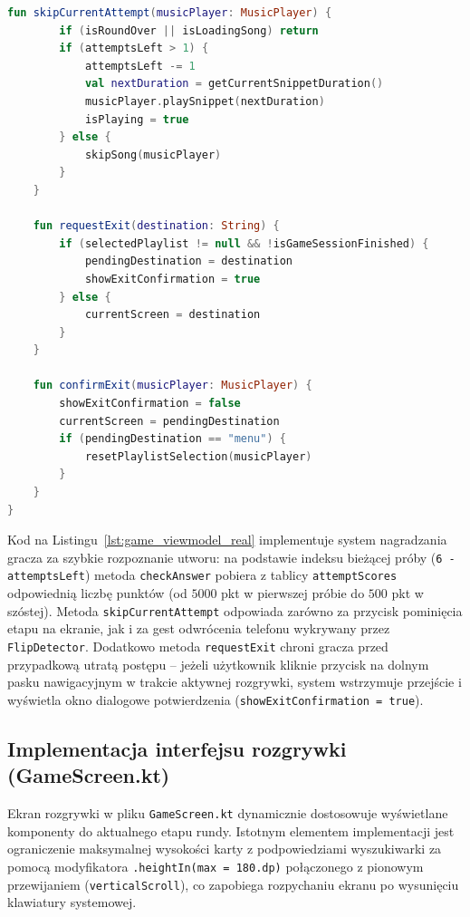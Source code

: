 \begin{lstlisting}[language=Kotlin, caption={Kluczowe metody logiki rozgrywki, punktacji i nawigacji w klasie GameViewModel.kt}, label={lst:game_viewmodel_real}]
    fun skipCurrentAttempt(musicPlayer: MusicPlayer) {
        if (isRoundOver || isLoadingSong) return
        if (attemptsLeft > 1) {
            attemptsLeft -= 1
            val nextDuration = getCurrentSnippetDuration()
            musicPlayer.playSnippet(nextDuration)
            isPlaying = true
        } else {
            skipSong(musicPlayer)
        }
    }

    fun requestExit(destination: String) {
        if (selectedPlaylist != null && !isGameSessionFinished) {
            pendingDestination = destination
            showExitConfirmation = true
        } else {
            currentScreen = destination
        }
    }

    fun confirmExit(musicPlayer: MusicPlayer) {
        showExitConfirmation = false
        currentScreen = pendingDestination
        if (pendingDestination == "menu") {
            resetPlaylistSelection(musicPlayer)
        }
    }
}
\end{lstlisting}

\hspace{0.60cm}Kod na Listingu~\ref{lst:game_viewmodel_real} implementuje system nagradzania gracza za szybkie rozpoznanie utworu: na podstawie indeksu bieżącej próby (\texttt{6 - attemptsLeft}) metoda \texttt{checkAnswer} pobiera z tablicy \texttt{attemptScores} odpowiednią liczbę punktów (od $5000$ pkt w pierwszej próbie do $500$ pkt w szóstej). Metoda \texttt{skipCurrentAttempt} odpowiada zarówno za przycisk pominięcia etapu na ekranie, jak i za gest odwrócenia telefonu wykrywany przez \texttt{FlipDetector}. Dodatkowo metoda \texttt{requestExit} chroni gracza przed przypadkową utratą postępu – jeżeli użytkownik kliknie przycisk na dolnym pasku nawigacyjnym w trakcie aktywnej rozgrywki, system wstrzymuje przejście i wyświetla okno dialogowe potwierdzenia (\texttt{showExitConfirmation = true}).

\subsection{Implementacja interfejsu rozgrywki (GameScreen.kt)}

\hspace{0.60cm}Ekran rozgrywki w pliku \texttt{GameScreen.kt} dynamicznie dostosowuje wyświetlane komponenty do aktualnego etapu rundy. Istotnym elementem implementacji jest ograniczenie maksymalnej wysokości karty z podpowiedziami wyszukiwarki za pomocą modyfikatora \texttt{.heightIn(max = 180.dp)} połączonego z pionowym przewijaniem (\texttt{verticalScroll}), co zapobiega rozpychaniu ekranu po wysunięciu klawiatury systemowej.

